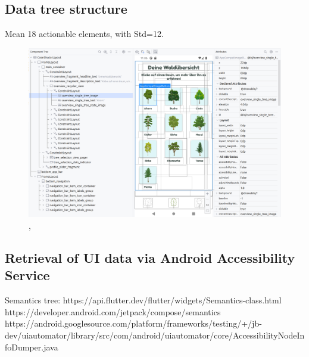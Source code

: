 \subsection{Data tree structure}
\label{subsec:data-tree-structure}


Mean 18 actionable elements, with Std=12. \cite{zhou2021large}

\begin{figure}
    \centering
    \includegraphics[width=\textwidth]{graphics/android_layout_inspector}
    \caption{\cite{android_layout_inspector}, \cite{mimuc_app_ins_gruene}}
    \label{fig:android_layout_inspector}
\end{figure}

\subsection{Retrieval of UI data via Android Accessibility Service}

Semantics tree:
https://api.flutter.dev/flutter/widgets/Semantics-class.html
https://developer.android.com/jetpack/compose/semantics \cite{android_semantics_compose}
https://android.googlesource.com/platform/frameworks/testing/+/jb-dev/uiautomator/library/src/com/android/uiautomator/core/AccessibilityNodeInfoDumper.java \cite{android_accessibility_node_info_dumper}



